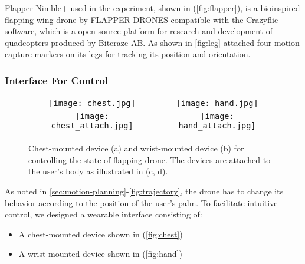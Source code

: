Flapper Nimble+ used in the experiment, shown in (\ref{fig:flapper}), is a bioinspired flapping-wing drone by FLAPPER DRONES compatible with the Crazyflie software, 
which is a open-source platform for research and development of quadcopters produced by Bitcraze AB. 
As shown in \ref{fig:leg} attached four motion capture markers on its legs for tracking its position and orientation. 

\subsubsection{Interface For Control}

\begin{figure}
  \centering
  \begin{tabular}{cc}
      \begin{minipage}[h]{0.4 \columnwidth}
        \centering
        \texttt{[image: chest.jpg]}
        \subcaption{}
        \label{fig:chest}
      \end{minipage} &
      \begin{minipage}[h]{0.4 \columnwidth}
        \centering
        \texttt{[image: hand.jpg]}
        \subcaption{}
        \label{fig:hand}
      \end{minipage}\\
      \begin{minipage}[h]{0.4 \columnwidth}
        \centering
        \texttt{[image: chest\_attach.jpg]}
        \subcaption{}
        \label{fig:chest_attach}
      \end{minipage} &
      \begin{minipage}[h]{0.4 \columnwidth}
        \centering
        \texttt{[image: hand\_attach.jpg]}
        \subcaption{}
        \label{fig:hand_attach}
      \end{minipage}
    \end{tabular}
  \caption{Chest-mounted device (a) and wrist-mounted device (b) for controlling the state of flapping drone. The devices are attached to the user's body as illustrated in (c, d).}
\end{figure}

As noted in \ref{sec:motion-planning}-\ref{fig:trajectory}, the drone has to change its behavior according to the position of the user's palm.
To facilitate intuitive control, we designed a wearable interface consisting of:
\begin{itemize}
    \item A chest-mounted device shown in (\ref{fig:chest})
    \item A wrist-mounted device shown in (\ref{fig:hand})
\end{itemize}

